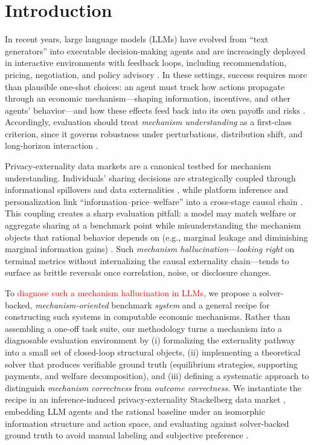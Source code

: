 \documentclass[sigconf,anonymous,review]{acmart}
\theoremstyle{definition}
\begin{document}
\section{Introduction}
In recent years, large language models (LLMs) have evolved from ``text generators'' into executable decision-making agents and are increasingly deployed in interactive environments with feedback loops, including recommendation, pricing, negotiation, and policy advisory \citep{gao2024large,park2023generative,aher2023using,horton2023large}. In these settings, success requires more than plausible one-shot choices: an agent must track how actions propagate through an economic mechanism—shaping information, incentives, and other agents' behavior—and how these effects feed back into its own payoffs and risks \citep{kiciman2023causal,richens2024robust,abdulaal2024causal}. Accordingly, evaluation should treat \emph{mechanism understanding} as a first-class criterion, since it governs robustness under perturbations, distribution shift, and long-horizon interaction \citep{huang2025far,akata2025repeatedgames}.

Privacy-externality data markets are a canonical testbed for mechanism understanding. Individuals' sharing decisions are strategically coupled through informational spillovers and data externalities \citep{acemoglu2022too,ichihashi2021economics,choi2019privacy,bergemann2022economics}, while platform inference and personalization link ``information--price--welfare'' into a cross-stage causal chain \citep{bergemann2019markets,goldfarb2023economics,fainmesser2023digital}. This coupling creates a sharp evaluation pitfall: a model may match welfare or aggregate sharing at a benchmark point while misunderstanding the mechanism objects that rational behavior depends on (e.g., marginal leakage and diminishing marginal information gains) \citep{acemoglu2022too}. Such \emph{mechanism hallucination}—\emph{looking right} on terminal metrics without internalizing the causal externality chain—tends to surface as brittle reversals once correlation, noise, or disclosure changes.

To \textcolor{red}{diagnose such a mechanism hallucination in LLMs}, we propose a solver-backed, \emph{mechanism-oriented} benchmark \emph{system} and a general recipe for constructing such systems in computable economic mechanisms. Rather than assembling a one-off task suite, our methodology turns a mechanism into a diagnosable evaluation environment by (i) formalizing the externality pathway into a small set of closed-loop structural objects, (ii) implementing a theoretical solver that produces verifiable ground truth (equilibrium strategies, supporting payments, and welfare decomposition), and (iii) defining a systematic approach to distinguish \emph{mechanism correctness} from \emph{outcome correctness}. We instantiate the recipe in an inference-induced privacy-externality Stackelberg data market \citep{acemoglu2022too}, embedding LLM agents and the rational baseline under an isomorphic information structure and action space, and evaluating against solver-backed ground truth to avoid manual labeling and subjective preference \citep{liu2023agentbench,duan2024gtbench}.
\end{document}
